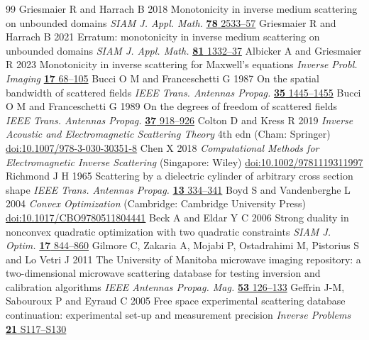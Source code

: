 \begin{thebibliography}{99}
Griesmaier R and Harrach B 2018 Monotonicity in inverse medium scattering on unbounded domains \emph{SIAM J. Appl. Math.} \href{https://doi.org/10.1137/18M1171679}{\textbf{78} 2533--57}
Griesmaier R and Harrach B 2021 Erratum: monotonicity in inverse medium scattering on unbounded domains \emph{SIAM J. Appl. Math.} \href{https://doi.org/10.1137/21M1399221}{\textbf{81} 1332--37}
 Albicker A and Griesmaier R 2023 Monotonicity in inverse scattering for Maxwell's equations \emph{Inverse Probl. Imaging} \href{https://doi.org/10.3934/ipi.2022032}{\textbf{17} 68--105}
 Bucci O M and Franceschetti G 1987 On the spatial bandwidth of scattered fields \emph{IEEE Trans. Antennas Propag.} \href{https://doi.org/10.1109/TAP.1987.1144024}{\textbf{35} 1445--1455}
 Bucci O M and Franceschetti G 1989 On the degrees of freedom of scattered fields \emph{IEEE Trans. Antennas Propag.} \href{https://doi.org/10.1109/8.29386}{\textbf{37} 918--926}
 Colton D and Kress R 2019 \emph{Inverse Acoustic and Electromagnetic Scattering Theory} 4th edn (Cham: Springer) \href{https://doi.org/10.1007/978-3-030-30351-8}{doi:10.1007/978-3-030-30351-8}
 Chen X 2018 \emph{Computational Methods for Electromagnetic Inverse Scattering} (Singapore: Wiley) \href{https://doi.org/10.1002/9781119311997}{doi:10.1002/9781119311997}
 Richmond J H 1965 Scattering by a dielectric cylinder of arbitrary cross section shape \emph{IEEE Trans. Antennas Propag.} \href{https://doi.org/10.1109/TAP.1965.1138427}{\textbf{13} 334--341}
 Boyd S and Vandenberghe L 2004 \emph{Convex Optimization} (Cambridge: Cambridge University Press) \href{https://doi.org/10.1017/CBO9780511804441}{doi:10.1017/CBO9780511804441}
 Beck A and Eldar Y C 2006 Strong duality in nonconvex quadratic optimization with two quadratic constraints \emph{SIAM J. Optim.} \href{https://doi.org/10.1137/050644471}{\textbf{17} 844--860}
 Gilmore C, Zakaria A, Mojabi P, Ostadrahimi M, Pistorius S and Lo Vetri J 2011 The University of Manitoba microwave imaging repository: a two-dimensional microwave scattering database for testing inversion and calibration algorithms \emph{IEEE Antennas Propag. Mag.} \href{https://doi.org/10.1109/MAP.2011.6138442}{\textbf{53} 126--133}
 Geffrin J-M, Sabouroux P and Eyraud C 2005 Free space experimental scattering database continuation: experimental set-up and measurement precision \emph{Inverse Problems} \href{https://doi.org/10.1088/0266-5611/21/6/S09}{\textbf{21} S117--S130}

\end{thebibliography}
